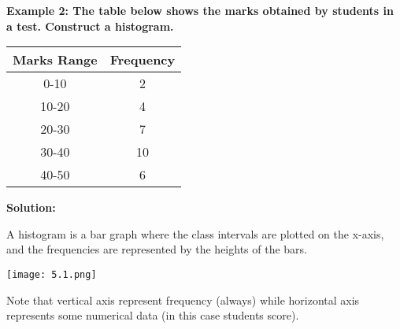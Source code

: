 \begin{flushleft}
	\textbf{Example 2: The table below shows the marks obtained by students in a test. Construct a histogram.}
	
	\vspace{0.5cm}
	
	\begin{center}
		\begin{tabular}{c|c}
			\textbf{Marks Range} & \textbf{Frequency} \\
			\hline
			0-10 & 2 \\
			10-20 & 4 \\
			20-30 & 7 \\
			30-40 & 10 \\
			40-50 & 6 \\
		\end{tabular}
	\end{center}
	
	\vspace{0.5cm}
	\textbf{Solution:}
	\vspace{0.5cm}
	
	A histogram is a bar graph where the class intervals are plotted on the x-axis, and the frequencies are represented by the heights of the bars.
	\begin{center}
		\texttt{[image: 5.1.png]}
	\end{center}
	Note that vertical axis represent frequency (always) while horizontal axis represents some numerical data (in this case students score).
\end{flushleft}

